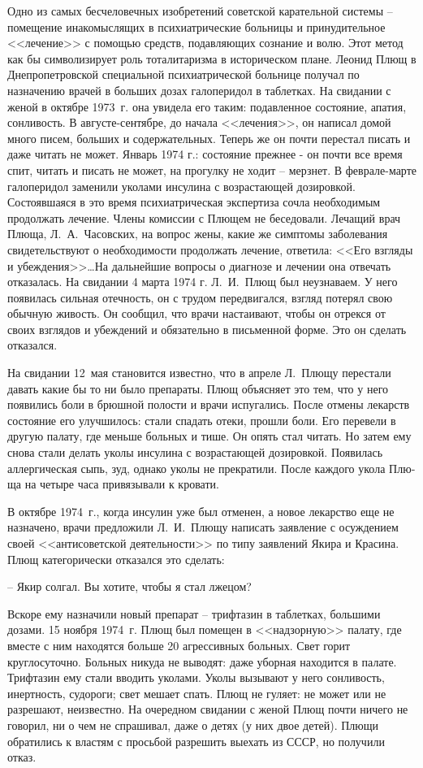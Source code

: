 \documentclass{book}
\begin{document}
Одно из самых бесчеловечных изобретений советской карательной системы -- помещение инакомыслящих в психиатрические больницы и принудительное <<лечение>> с помощью средств, подавляющих сознание и волю. Этот метод как бы символизирует роль тоталитаризма в историческом плане. Леонид Плющ в Днепропетровской специальной психиатрической больнице полу­чал по назначению врачей в больших дозах галоперидол в таблет­ках. На свидании с женой в октябре 1973~г. она увидела его та­ким: подавленное состояние, апатия, сонливость. В августе-сен­тябре, до начала <<лечения>>, он написал домой много писем, боль­ших и содержательных. Теперь же он почти перестал писать и да­же читать не может. Январь 1974 г.: состояние прежнее - он поч­ти все время спит, читать и писать не может, на прогулку не хо­дит -- мерзнет. В феврале-марте галоперидол заменили уколами инсулина с возрастающей дозировкой. Состоявшаяся в это вре­мя психиатрическая экспертиза сочла необходимым продолжать лечение. Члены комиссии с Плющем не беседовали. Лечащий врач 
Плюща, Л.~А.~Часовских, на вопрос жены, какие же симптомы заболевания свидетельствуют о необходимости продолжать лечение, ответила: <<Его взгляды и убеждения>>\ldots На дальнейшие вопросы о диагнозе и лечении она отвечать отказалась.
На свидании 4 марта 1974 г. Л.~И.~Плющ был неузнаваем. У него появилась сильная отечность, он с трудом передвигался, взгляд потерял свою обычную живость. Он сообщил, что врачи настаивают, чтобы он отрекся от своих взглядов и убеж­дений и обязательно в письменной форме. Это он сделать отказался.

На свидании 12~мая становится известно, что в апреле Л.~Плю­щу перестали давать какие бы то ни было препараты. Плющ объясняет это тем, что у него появились боли в брюшной поло­сти и врачи испугались. После отмены лекарств состояние его улучшилось: стали спадать отеки, прошли боли. Его перевели в другую палату, где меньше больных и тише. Он опять стал читать. Но затем ему снова стали делать уколы инсулина с возрастающей дозировкой. Появилась аллергическая сыпь, зуд, однако уколы не прекратили. После каждого укола Плю­ща на четыре часа привязывали к кровати.

В октябре 1974~г., когда инсулин уже был отменен, а но­вое лекарство еще не назначено, врачи предложили Л.~И.~Плю­щу написать заявление с осуждением своей <<антисоветской деятельности>> по типу заявлений Якира и Красина. Плющ кате­горически отказался это сделать:

-- Якир солгал. Вы хотите, чтобы я стал лжецом?

Вскоре ему назначили новый препарат -- трифтазин в таблетках, большими дозами. 15 ноября 1974~г. Плющ был помещен в <<надзорную>> палату, где вместе с ним находятся больше 20 агрессивных больных. Свет горит круглосуточно. Больных никуда не выводят: даже уборная находится в палате. Трифтазин ему стали вводить уколами. Уколы вызывают у него сон­ливость, инертность, судороги; свет мешает спать. Плющ не гуляет: не может или не разрешают, неизвестно. На очередном свидании с женой Плющ почти ничего не говорил, ни о чем не спрашивал, даже о детях (у них двое детей). Плющи обрати­лись к властям с просьбой разрешить выехать из СССР, но получили отказ.
\end{document}
